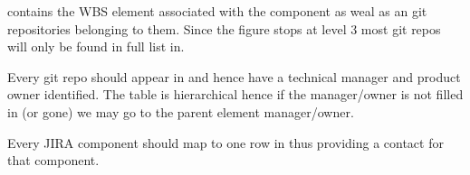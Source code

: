  contains the WBS element associated with the component as weal as an git repositories belonging to them.
 Since the figure stops at level 3 most git repos will only be found in full list in.

 Every git repo should appear in   and hence have a technical manager and product owner identified. The table is hierarchical hence if the manager/owner is not filled in (or gone) we may go to the parent element manager/owner.

 Every JIRA component should map to one row in  thus providing a contact for that component.
